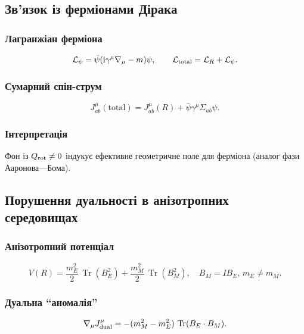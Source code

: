\documentclass[11pt,a4paper]{article}
\numberwithin{equation}{section}
\theoremstyle{plain}
\theoremstyle{definition}
\theoremstyle{remark}
\DeclareMathOperator{\Tr}{Tr}
\newcommand{\ii}{\mathrm{i}}
\begin{document}
\subsection{Зв’язок із ферміонами Дірака}

\subsubsection{Лагранжіан ферміона}

\begin{equation}
\mathcal{L}_\psi = \bar{\psi}(\ii\gamma^\mu\nabla_\mu - m)\psi,\qquad \mathcal{L}_{\rm total}=\mathcal{L}_R+\mathcal{L}_\psi.
\end{equation}

\subsubsection{Сумарний спін-струм}

\begin{equation}
J^\mu_{ab}(\text{total}) = J^\mu_{ab}(R) + \bar{\psi}\gamma^\mu\Sigma_{ab}\psi.
\end{equation}

\subsubsection{Інтерпретація}

Фон із $Q_{\rm rot}\neq 0$ індукує ефективне геометричне поле для ферміона (аналог фази Ааронова—Бома).

\subsection{Порушення дуальності в анізотропних середовищах}

\subsubsection{Анізотропний потенціал}

\begin{equation}
V(R) = \frac{m_E^2}{2}\,\Tr(B_E^2) + \frac{m_M^2}{2}\,\Tr(B_M^2),\quad B_M=IB_E,\, m_E\neq m_M.
\end{equation}

\subsubsection{Дуальна ``аномалія''}

\begin{equation}
\nabla_\mu J^\mu_{\rm dual} = -(m_M^2 - m_E^2)\,\Tr(B_E\cdot B_M).
\end{equation}
\end{document}

